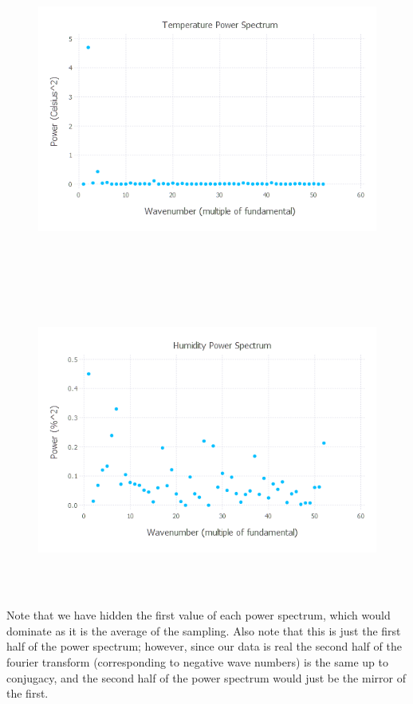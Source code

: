 \documentclass{article}
\begin{document}
\begin{figure}[H]
	\includegraphics[width=6in,height=4in]{"temp_PS"}
\end{figure}
\begin{figure}[H]
	\includegraphics[width=6in,height=4in]{"hum_PS"}
\end{figure}

Note that we have hidden the first value of each power spectrum, which would dominate as it is the average of the sampling. Also note that this is just the first half of the power spectrum; however, since our data is real the second half of the fourier transform (corresponding to negative wave numbers) is the same up to conjugacy, and the second half of the power spectrum would just be the mirror of the first.
\end{document}
